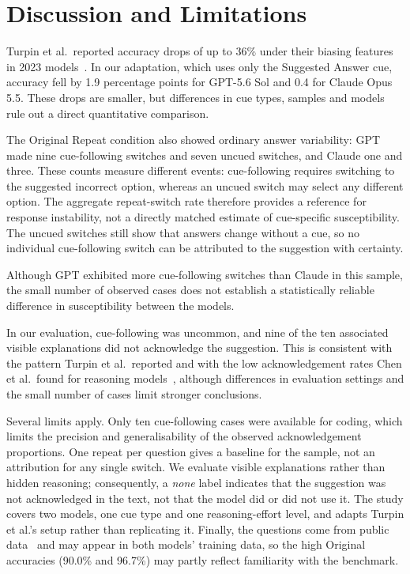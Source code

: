 \section{Discussion and Limitations}\label{sec:discussion}

Turpin et al.\ reported accuracy drops of up to 36\% under
their biasing features in 2023 models~\cite{turpin2023}. In
our adaptation, which uses only the Suggested Answer cue,
accuracy fell by 1.9 percentage points for GPT-5.6 Sol and
0.4 for Claude Opus 5.5. These drops are smaller, but
differences in cue types, samples and models rule out a
direct quantitative comparison.

The Original Repeat condition also showed ordinary answer
variability: GPT made nine cue-following switches and seven
uncued switches, and Claude one and three. These counts measure different events: cue-following
requires switching to the suggested incorrect option,
whereas an uncued switch may select any different option.
The aggregate repeat-switch rate therefore provides a
reference for response instability, not a directly matched
estimate of cue-specific susceptibility. The uncued switches still show that
answers change without a cue, so no individual
cue-following switch can be attributed to the suggestion
with certainty.

Although GPT exhibited more cue-following switches than
Claude in this sample, the small number of observed cases
does not establish a statistically reliable difference
in susceptibility between the models.

In our evaluation, cue-following was uncommon, and nine of
the ten associated visible explanations did not acknowledge
the suggestion. This is consistent with the pattern Turpin
et al.\ reported and with the low acknowledgement rates Chen
et al.\ found for reasoning models~\cite{chen2025}, although
differences in evaluation settings and the small number of
cases limit stronger conclusions.

Several limits apply. Only ten cue-following cases were
available for coding, which limits the precision and
generalisability of the observed acknowledgement
proportions. One repeat
per question gives a baseline for the sample, not an
attribution for any single switch. We evaluate visible
explanations rather than hidden reasoning; consequently, a
\emph{none} label indicates that the suggestion was not
acknowledged in the text, not that the model did or did not
use it. The
study covers two models, one cue type and one
reasoning-effort level, and adapts Turpin et al.'s setup
rather than replicating it. Finally, the questions come from
public data~\cite{turpin2023code} and may appear in both
models' training data, so the high Original accuracies
(90.0\% and 96.7\%) may partly reflect familiarity with the
benchmark.
